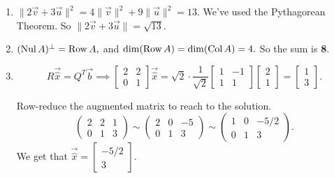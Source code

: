 \begin{enumerate}
	\item[\textbf{Q6}] \(\|2\vec{v} + 3\vec{u}\|^2 = 4\|\vec{v}\|^2 + 9\|\vec{u}\|^2 = 13.\) We've used the Pythagorean Theorem. 
			So \(\|2\vec{v} + 3\vec{u}\| = \sqrt{13}\).
	\item[\textbf{Q7}] \((\operatorname{Nul} A)^\perp = \operatorname{Row} A,\) and \(\dim(\operatorname{Row} A) = \dim(\operatorname{Col} A) = 4.\) So the sum is \textbf{8}. 

	\item[\textbf{Q8}] \[R\vec{\hat{x}} = Q^T\vec{b} \implies \begin{bmatrix}2 & 2 \\ 0 & 1\end{bmatrix}\vec{\hat{x}}
								 = \sqrt{2} \cdot \frac{1}{\sqrt{2}} \begin{bmatrix}1 & - 1 \\ 1 & 1\end{bmatrix}
								 \begin{bmatrix}2 \\ 1\end{bmatrix} = \begin{bmatrix}1 \\ 3\end{bmatrix}.\]

					Row-reduce the augmented matrix to reach to the solution. 
					\[\left(\!\!\begin{array}{cc|c}2 & 2 & 1 \\ 0 & 1 & 3\end{array}\!\!\right) 
					  \sim \left(\!\!\begin{array}{cc|c}2 & 0 & -5 \\ 0 & 1 & 3\end{array}\!\!\right)
					  \sim \left(\!\!\begin{array}{cc|c}1 & 0 & -5/2 \\ 0 & 1 & 3\end{array}\!\!\right).\]
					We get that \(\vec{\hat{x}} = \begin{bmatrix}-5/2 \\ 3\end{bmatrix}\).


\end{enumerate}
